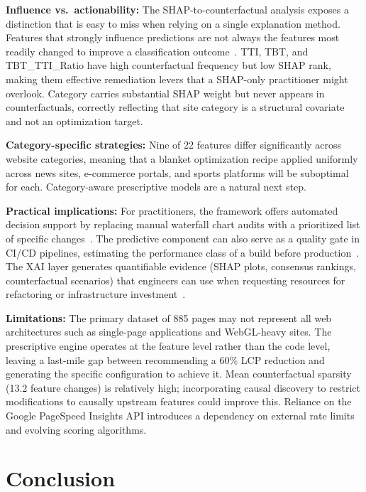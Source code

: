 \documentclass{svproc}
\begin{document}
\textbf{Influence vs.\ actionability:} The SHAP-to-counterfactual analysis exposes a distinction that is easy to miss when relying on a single explanation method. Features that strongly influence predictions are not always the features most readily changed to improve a classification outcome~\cite{goldwasser2024,ali2023}. TTI, TBT, and TBT\_TTI\_Ratio have high counterfactual frequency but low SHAP rank, making them effective remediation levers that a SHAP-only practitioner might overlook. Category carries substantial SHAP weight but never appears in counterfactuals, correctly reflecting that site category is a structural covariate and not an optimization target.

\textbf{Category-specific strategies:} Nine of 22 features differ significantly across website categories, meaning that a blanket optimization recipe applied uniformly across news sites, e-commerce portals, and sports platforms will be suboptimal for each. Category-aware prescriptive models are a natural next step.

\textbf{Practical implications:} For practitioners, the framework offers automated decision support by replacing manual waterfall chart audits with a prioritized list of specific changes~\cite{vanriet2023}. The predictive component can also serve as a quality gate in CI/CD pipelines, estimating the performance class of a build before production~\cite{dakic2025}. The XAI layer generates quantifiable evidence (SHAP plots, consensus rankings, counterfactual scenarios) that engineers can use when requesting resources for refactoring or infrastructure investment~\cite{hassija2024}.

\textbf{Limitations:} The primary dataset of 885 pages may not represent all web architectures such as single-page applications and WebGL-heavy sites. The prescriptive engine operates at the feature level rather than the code level, leaving a last-mile gap between recommending a 60\% LCP reduction and generating the specific configuration to achieve it. Mean counterfactual sparsity (13.2 feature changes) is relatively high; incorporating causal discovery to restrict modifications to causally upstream features could improve this. Reliance on the Google PageSpeed Insights API introduces a dependency on external rate limits and evolving scoring algorithms.

\section{Conclusion}
\end{document}
